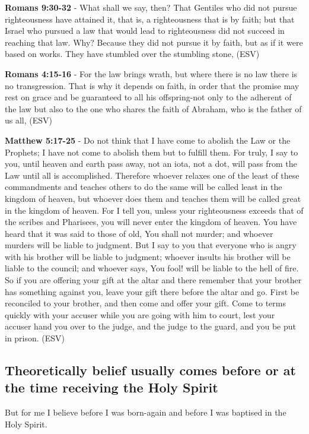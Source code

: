 \documentclass[11pt]{article}
\begin{document}
\textbf{Romans 9:30-32} - What shall we say, then? That Gentiles who did not pursue righteousness have attained it, that is, a righteousness that is by faith; but that Israel who pursued a law that would lead to righteousness did not succeed in reaching that law. Why? Because they did not pursue it by faith, but as if it were based on works. They have stumbled over the stumbling stone, (ESV)

\textbf{Romans 4:15-16} - For the law brings wrath, but where there is no law there is no transgression. That is why it depends on faith, in order that the promise may rest on grace and be guaranteed to all his offspring-not only to the adherent of the law but also to the one who shares the faith of Abraham, who is the father of us all, (ESV)

\textbf{Matthew 5:17-25} - Do not think that I have come to abolish the Law or the Prophets; I have not come to abolish them but to fulfill them. For truly, I say to you, until heaven and earth pass away, not an iota, not a dot, will pass from the Law until all is accomplished. Therefore whoever relaxes one of the least of these commandments and teaches others to do the same will be called least in the kingdom of heaven, but whoever does them and teaches them will be called great in the kingdom of heaven. For I tell you, unless your righteousness exceeds that of the scribes and Pharisees, you will never enter the kingdom of heaven. You have heard that it was said to those of old, You shall not murder; and whoever murders will be liable to judgment. But I say to you that everyone who is angry with his brother will be liable to judgment; whoever insults his brother will be liable to the council; and whoever says, You fool! will be liable to the hell of fire. So if you are offering your gift at the altar and there remember that your brother has something against you, leave your gift there before the altar and go. First be reconciled to your brother, and then come and offer your gift. Come to terms quickly with your accuser while you are going with him to court, lest your accuser hand you over to the judge, and the judge to the guard, and you be put in prison. (ESV)

\subsection{Theoretically belief usually comes before or at the time receiving the Holy Spirit}
\label{sec:orgb344d98}
But for me I believe before I was born-again and before I was baptised in the Holy Spirit.
\end{document}
